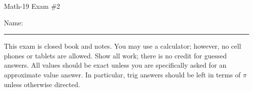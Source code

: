 \documentclass[letterpaper,12pt,fleqn]{article}
\begin{document}
\begin{center}
\Large Math-19 Exam \#2
\end{center}

\vspace{0.5in}

Name: \rule{4in}{1pt}

\vspace{0.5in}

This exam is closed book and notes. You may use a calculator; however, no cell
phones or tablets are allowed. Show all work; there is no credit for guessed
answers. All values should be exact unless you are specifically asked for an
approximate value answer. In particular, trig answers should be left in terms
of $\pi$ unless otherwise directed.

\vspace{0.5in}
\end{document}
